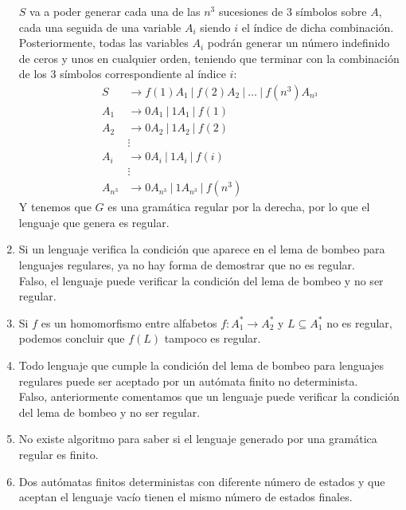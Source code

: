 \begin{enumerate}
        $S$ va a poder generar cada una de las $n^3$ sucesiones de 3 símbolos sobre $A$, cada una seguida de una variable $A_i$ siendo $i$ el índice de dicha combinación. Posteriormente, todas las variables $A_i$ podrán generar un número indefinido de ceros y unos en cualquier orden, teniendo que terminar con la combinación de los 3 símbolos correspondiente al índice $i$:
        \begin{align*}
            S &\rightarrow f(1)A_1\ |\ f(2)A_2\ |\ \ldots\ |\ f(n^3)A_{n^3} \\
            A_1 &\rightarrow 0A_1\ |\ 1A_1\ |\ f(1) \\
            A_2 &\rightarrow 0A_2\ |\ 1A_2\ |\ f(2) \\
                &\vdots \\
            A_i &\rightarrow 0A_i\ |\ 1A_i\ |\ f(i) \\
                &\vdots \\
            A_{n^3} &\rightarrow 0A_{n^3}\ |\ 1A_{n^3}\ |\ f(n^3)
        \end{align*}
        Y tenemos que $G$ es una gramática regular por la derecha, por lo que el lenguaje que genera es regular.
    \item Si un lenguaje verifica la condición que aparece en el lema de bombeo para lenguajes regulares, ya no hay forma de demostrar que no es regular.\\

        Falso, el lenguaje puede verificar la condición del lema de bombeo y no ser regular.
    \item Si $f$ es un homomorfismo entre alfabetos $f:A_1^\ast\rightarrow A_2^\ast$ y $L\subseteq A_1^\ast$ no es regular, podemos concluir que $f(L)$ tampoco es regular.\\

    \item Todo lenguaje que cumple la condición del lema de bombeo para lenguajes regulares puede ser aceptado por un autómata finito no determinista.\\

        Falso, anteriormente comentamos que un lenguaje puede verificar la condición del lema de bombeo y no ser regular.
    \item No existe algoritmo para saber si el lenguaje generado por una gramática regular es finito.\\

    \item Dos autómatas finitos deterministas con diferente número de estados y que aceptan el lenguaje vacío tienen el mismo número de estados finales.\\


\end{enumerate}
